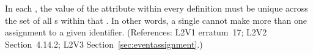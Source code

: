 In each \Event, the value of the  attribute
within every \EventAssignment definition must be unique across the set of
all \EventAssignment{}s within that \Event.  In other words, a
single \Event cannot make more than one assignment to a given
identifier.  (References: L2V1 erratum~17; L2V2 Section~4.14.2;
L2V3 Section~\ref{sec:eventassignment}.)
